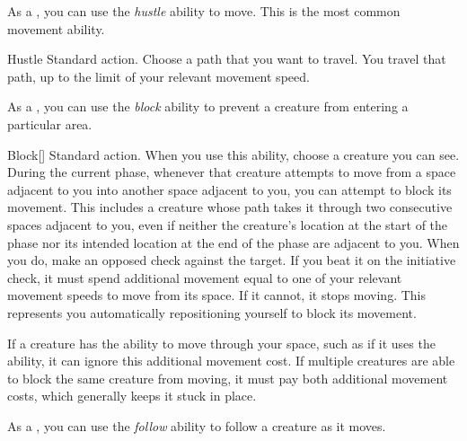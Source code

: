          As a , you can use the \textit{hustle} ability to move.
        This is the most common movement ability.

        \begin{activeability}{Hustle}
                \abilityusagetime Standard action.
            \rankline
            Choose a path that you want to travel.
            You travel that path, up to the limit of your relevant movement speed.
        \end{activeability}

         As a , you can use the \textit{block} ability to prevent a creature from entering a particular area.

        \begin{activeability}{Block}[]
            \abilityusagetime Standard action.
            \rankline
            When you use this ability, choose a creature you can see.
            During the current phase, whenever that creature attempts to move from a space adjacent to you into another space adjacent to you, you can attempt to block its movement.
            This includes a creature whose path takes it through two consecutive spaces adjacent to you, even if neither the creature's location at the start of the phase nor its intended location at the end of the phase are adjacent to you.
            When you do, make an opposed  check against the target.
            If you beat it on the initiative check, it must spend additional movement equal to one of your relevant movement speeds to move from its space.
            If it cannot, it stops moving.
            This represents you automatically repositioning yourself to block its movement.

            If a creature has the ability to move through your space, such as if it uses the  ability, it can ignore this additional movement cost.
            If multiple creatures are able to block the same creature from moving, it must pay both additional movement costs, which generally keeps it stuck in place.
        \end{activeability}

         As a , you can use the \textit{follow} ability to follow a creature as it moves.


